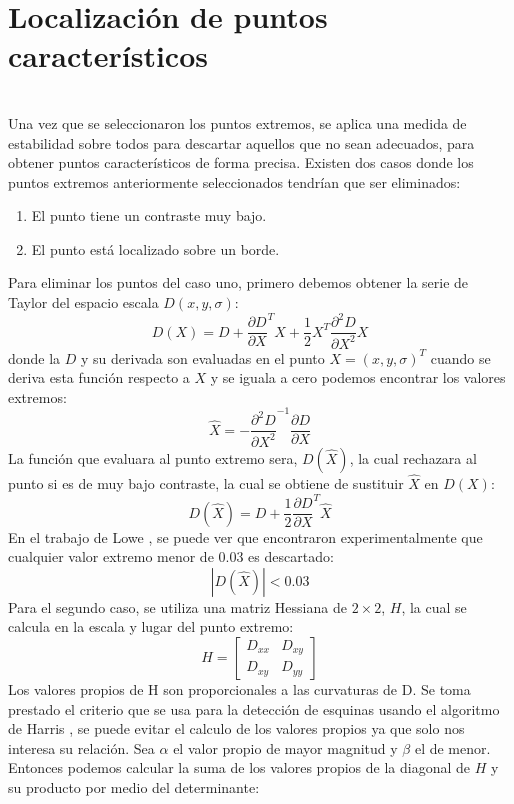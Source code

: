 	

	
	\section{Localización de puntos característicos} \hfill \\ 
		Una vez que se seleccionaron los puntos extremos, se aplica una medida de estabilidad sobre todos para descartar aquellos que no sean adecuados, para obtener puntos  característicos de forma precisa. Existen dos casos donde los puntos extremos anteriormente seleccionados tendrían que ser eliminados:
	\begin{enumerate}
		\item El punto tiene un contraste muy bajo.
		\item El punto está localizado sobre un borde.
	\end{enumerate}			
	Para eliminar los puntos del caso uno, primero debemos obtener la serie de Taylor del espacio escala $D(x,y,\sigma)$:
		$$D(X)=D +\frac{\partial D}{\partial X}^T X+ \frac{1}{2} X^T\frac{\partial^2 D}{\partial X^2} X $$
		donde la $D$ y su derivada son evaluadas en el punto $X = (x,y,\sigma)^T$ cuando se deriva esta función respecto a $X$ y se iguala a cero podemos encontrar los valores extremos: 
	    $$ \hat{X} = - \frac{\partial^2 D}{\partial X^2}^{-1}\frac{\partial D}{\partial X}$$
	 	La función que evaluara al punto extremo sera, $D(\hat{X})$, la cual rechazara al punto si es de muy bajo contraste, la cual se obtiene de sustituir $\hat{X}$ en $D(X)$:
	 	$$D(\hat{X})=D + \frac{1}{2} \frac{\partial D}{\partial X}^T \hat{X} $$ 	 
	 	En el trabajo de Lowe \cite{Lowe2004}, se  puede ver que encontraron experimentalmente que cualquier valor extremo menor de 0.03 es descartado:
	 	$$ |D(\hat{X})|< 0.03$$ 	 
	 	Para el segundo caso, se utiliza una matriz Hessiana de $2\times2$, $H$, la cual se calcula en la escala y lugar del punto extremo:
		$$ 
		H
		=
		\begin{bmatrix}
			D_{xx} & D_{xy}\\
    		D_{xy} & D_{yy}
		\end{bmatrix}		 	
		$$	
		Los valores propios de H son proporcionales a las curvaturas de D. Se toma prestado el criterio que se usa para la detección de esquinas usando el algoritmo de Harris \cite{Harris1988}, se puede evitar el calculo de los valores propios ya que solo nos interesa su relación. Sea $\alpha$ el valor propio de mayor magnitud y $\beta$ el de menor. Entonces podemos calcular la suma de los valores propios de la diagonal de $H$ y su producto por medio del determinante:
